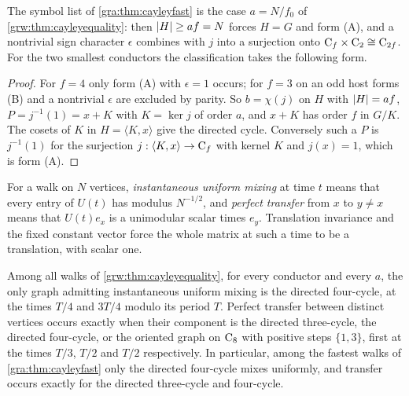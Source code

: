 The symbol list of \cref{gra:thm:cayleyfast} is the case $a=N/f_0$ of
\cref{grw:thm:cayleyequality}: then $\lvert H\rvert\ge af=N$ forces $H=G$ and form
(A), and a nontrivial sign character $\epsilon$ combines with $j$ into a
surjection onto $\mathrm{C}_f\times\mathrm{C}_2\cong\mathrm{C}_{2f}$. For the two
smallest conductors the classification takes the following form.


\begin{proof}
For $f=4$ only form (A) with $\epsilon=1$ occurs; for $f=3$ on an odd host
forms (B) and a nontrivial $\epsilon$ are excluded by parity. So
$b=\chi(j)$ on $H$ with $\lvert H\rvert=af$, $P=j^{-1}(1)=x+K$ with $K=\ker j$ of
order $a$, and $x+K$ has order $f$ in $G/K$. The cosets of $K$ in
$H=\langle K,x\rangle$ give the directed cycle. Conversely such a $P$ is
$j^{-1}(1)$ for the surjection $j:\langle K,x\rangle\to\mathrm{C}_f$ with
kernel $K$ and $j(x)=1$, which is form (A).
\end{proof}

For a walk on $N$ vertices, \emph{instantaneous uniform mixing} at time $t$
means that every entry of $U(t)$ has modulus $N^{-1/2}$, and \emph{perfect
transfer} from $x$ to $y\ne x$ means that $U(t)e_x$ is a unimodular scalar
times $e_y$. Translation invariance and the fixed constant vector force the
whole matrix at such a time to be a translation, with scalar one.

\begin{theorem}\label{gra:cor:cayleymixing}
Among all walks of \cref{grw:thm:cayleyequality}, for every conductor and
every $a$, the only graph admitting instantaneous uniform mixing is the
directed four-cycle, at the times $T/4$ and $3T/4$ modulo its period $T$.
Perfect transfer between distinct vertices occurs exactly when their
component is the directed three-cycle, the directed four-cycle, or the
oriented graph on $\mathrm{C}_8$ with positive steps $\{1,3\}$, first at the
times $T/3$, $T/2$ and $T/2$ respectively. In particular, among the fastest
walks of \cref{gra:thm:cayleyfast} only the directed four-cycle mixes
uniformly, and transfer occurs exactly for the directed three-cycle and
four-cycle.
\end{theorem}

